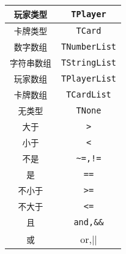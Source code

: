 \begin{center}
\begin{longtable}{|c|c|}
\hline \verb|玩家类型| & \verb|TPlayer| \\
\hline \verb|卡牌类型| & \verb|TCard| \\
\hline \verb|数字数组| & \verb|TNumberList| \\
\hline \verb|字符串数组| & \verb|TStringList| \\
\hline \verb|玩家数组| & \verb|TPlayerList| \\
\hline \verb|卡牌数组| & \verb|TCardList| \\
\hline \verb|无类型| & \verb|TNone| \\
\hline \verb|大于| & \verb|>| \\
\hline \verb|小于| & \verb|<| \\
\hline \verb|不是| & \verb|~=,!=| \\
\hline \verb|是| & \verb|==| \\
\hline \verb|不小于| & \verb|>=| \\
\hline \verb|不大于| & \verb|<=| \\
\hline \verb|且| & \verb|and,&&| \\
\hline \verb|或| & or,|| \\
\hline
\end{longtable}
\end{center}
%
